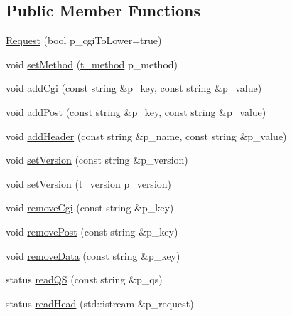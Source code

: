 \subsection*{Public Member Functions}
\begin{DoxyCompactItemize}
\item 
\hyperlink{classxtd_1_1network_1_1http_1_1Request_a6255d0a163700ed3aec8b8e655573208}{Request} (bool p\+\_\+cgi\+To\+Lower=true)
\item 
void \hyperlink{classxtd_1_1network_1_1http_1_1Request_a3ee369c6c2b8888815f1347d9f7df3f0}{set\+Method} (\hyperlink{classxtd_1_1network_1_1http_1_1Request_a789d6d688af4e63cc725542fc7925627}{t\+\_\+method} p\+\_\+method)
\item 
void \hyperlink{classxtd_1_1network_1_1http_1_1Request_a42304776ec9355ab89c6e8e0391f4309}{add\+Cgi} (const string \&p\+\_\+key, const string \&p\+\_\+value)
\item 
void \hyperlink{classxtd_1_1network_1_1http_1_1Request_a463b8876852246bac863584f9dc3d0ae}{add\+Post} (const string \&p\+\_\+key, const string \&p\+\_\+value)
\item 
void \hyperlink{classxtd_1_1network_1_1http_1_1Request_ac7f15d9f25ab85da1569e7718ea6544d}{add\+Header} (const string \&p\+\_\+name, const string \&p\+\_\+value)
\item 
void \hyperlink{classxtd_1_1network_1_1http_1_1Request_a4fc25edc6c133d46f1780a3b8c5a3c4e}{set\+Version} (const string \&p\+\_\+version)
\item 
void \hyperlink{classxtd_1_1network_1_1http_1_1Request_a3a56519771fa2e7af734152a12b56361}{set\+Version} (\hyperlink{classxtd_1_1network_1_1http_1_1Request_ad1842a3667ff0a96222bb69262cda536}{t\+\_\+version} p\+\_\+version)
\item 
void \hyperlink{classxtd_1_1network_1_1http_1_1Request_a2e739ee31fca9fdddc4fa69432405b09}{remove\+Cgi} (const string \&p\+\_\+key)
\item 
void \hyperlink{classxtd_1_1network_1_1http_1_1Request_a69b20f61fbdf1727be7b6eb4623e30d7}{remove\+Post} (const string \&p\+\_\+key)
\item 
void \hyperlink{classxtd_1_1network_1_1http_1_1Request_adbbc4691784a7e7f49e31ffe54b733dd}{remove\+Data} (const string \&p\+\_\+key)
\item 
status \hyperlink{classxtd_1_1network_1_1http_1_1Request_acd61448f2826e30001bf6d9ada90a2a6}{read\+QS} (const string \&p\+\_\+qs)
\item 
status \hyperlink{classxtd_1_1network_1_1http_1_1Request_a1f25a3becd01d0ee957ecd697f178956}{read\+Head} (std\+::istream \&p\+\_\+request)

\end{DoxyCompactItemize}
